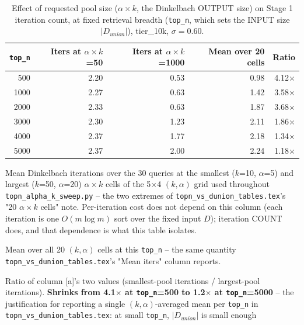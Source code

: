 
\begin{table}[t]
\centering
\begin{threeparttable}
\caption{Effect of requested pool size ($\alpha{\times}k$, the Dinkelbach OUTPUT size) on Stage 1
iteration count, at fixed retrieval breadth (\texttt{top\_n}, which sets the INPUT size
$|D_{union}|$), tier\_10k, $\sigma=0.60$.}
\label{tab:wdc-dinkelbach-iters-by-output-tier10k}
\begin{tabular}{rrrrr}
\toprule
\texttt{top\_n} & Iters at $\alpha{\times}k$=50\tnote{a} & Iters at $\alpha{\times}k$=1000\tnote{a} & Mean over 20 cells\tnote{b} & Ratio\tnote{c} \\
\midrule
 500 & 2.20 & 0.53 & 0.98 & 4.12$\times$ \\
1000 & 2.27 & 0.63 & 1.42 & 3.58$\times$ \\
2000 & 2.33 & 0.63 & 1.87 & 3.68$\times$ \\
3000 & 2.30 & 1.23 & 2.11 & 1.86$\times$ \\
4000 & 2.37 & 1.77 & 2.18 & 1.34$\times$ \\
5000 & 2.37 & 2.00 & 2.24 & 1.18$\times$ \\
\bottomrule
\end{tabular}
\begin{tablenotes}
\footnotesize
\item[a] Mean Dinkelbach iterations over the 30 queries at the smallest ($k$=10, $\alpha$=5) and
  largest ($k$=50, $\alpha$=20) $\alpha{\times}k$ cells of the 5$\times$4 $(k,\alpha)$ grid used
  throughout \texttt{topn\_alpha\_k\_sweep.py} -- the two extremes of \texttt{topn\_vs\_dunion\_tables.tex}'s
  "20 $\alpha{\times}k$ cells" note. Per-iteration cost does not depend on this column (each
  iteration is one $O(m\log m)$ sort over the fixed input $D$); iteration COUNT does, and that
  dependence is what this table isolates.
\item[b] Mean over all 20 $(k,\alpha)$ cells at this \texttt{top\_n} -- the same quantity
  \texttt{topn\_vs\_dunion\_tables.tex}'s "Mean iters" column reports.
\item[c] Ratio of column [a]'s two values (smallest-pool iterations / largest-pool iterations).
  \textbf{Shrinks from 4.1$\times$ at \texttt{top\_n}=500 to 1.2$\times$ at \texttt{top\_n}=5000} --
  the justification for reporting a single $(k,\alpha)$-averaged mean per \texttt{top\_n} in
  \texttt{topn\_vs\_dunion\_tables.tex}: at small \texttt{top\_n}, $|D_{union}|$ is small enough

\end{tablenotes}
\end{threeparttable}
\end{table}
